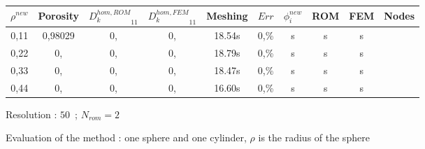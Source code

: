 {\begin{figure}[H]%
%
\begin{center}
\begin{tabular}{|c|c||c|c||c|c||c|c||c||c|}
\hline
\rowcolor{lightgray} $\rho^{new}$&Porosity&${D_k^{hom,ROM}}_{11}$&${D_k^{hom,FEM}}_{11}$&Meshing&$Err$&$\phi_i^{new}$&ROM&FEM&Nodes\\
\hline
0,11&0,98029&0,&0,&18.54s&0,\%&s&s&s&\\
\hline
0,22&0,&0,&0,&18.79s&0,\%&s&s&s&\\
\hline
0,33&0,&0,&0,&18.47s&0,\%&s&s&s&\\
\hline
0,44&0,&0,&0,&16.60s&0,\%&s&s&s&\\
\hline
\end{tabular}
\end{center}
\caption{Resolution : $50$\ ; $N_{rom}=2$}
%
\end{figure}

\ligneinter

\begin{figure}[H]%
%
\begin{table}[H]
\begin{center}
%
%
\qquad
{}%
%
\end{center}
\end{table}
%
\caption{Evaluation of the method : one sphere and one cylinder, $\rho$ is the radius of the sphere}
\end{figure}

}
